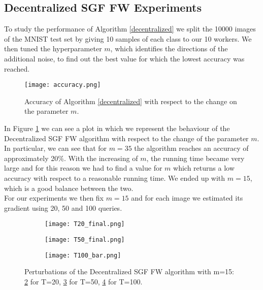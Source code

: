 \subsection{Decentralized SGF FW Experiments}
To study the performance of Algorithm \ref{decentralized} we split the 10000 images of the MNIST test set by giving 10 samples of each class to our 10 workers.
We then tuned the hyperparameter $m$, which identifies the directions of the additional noise, to find out the best value for which the lowest accuracy was reached.
\begin{figure}[htbp]
	\centering
	\texttt{[image: accuracy.png]}
	\caption{{\small Accuracy of Algorithm \ref{decentralized} with respect to the change on the parameter $m$.}}
	\label{fig:accuracy}
\end{figure}
In Figure \ref{fig:accuracy} we can see a plot in which we represent the behaviour of the Decentralized SGF FW algorithm  with respect to the change of the parameter $m$. In particular, we can see that for $m=35$ the algorithm reaches an accuracy of approximately 20\%. With the increasing of $m$, the running time became very large and for this reason we had to find a value for $m$ which returns a low accuracy with respect to a reasonable running time. We ended up with $m=15$, which is a good balance between the two.\\
\indent For our experiments we then fix $m=15$ and for each image we estimated its gradient using 20, 50 and 100 queries.

\begin{figure}[h]
	\centering
	\begin{subfigure}[b]{0.15\textwidth}
		\centering
		\texttt{[image: T20\_final.png]}
		\caption{}
		\label{fig:decentralized_perturbation_20}
	\end{subfigure}
	\hfill
	\begin{subfigure}[b]{0.15\textwidth}
		\texttt{[image: T50\_final.png]}
		\caption{}
		\label{fig:decentralized_perturbation_50}
	\end{subfigure}
	\hfill
	\begin{subfigure}[b]{0.15\textwidth}
		\texttt{[image: T100\_bar.png]}
		\caption{}
		\label{fig:decentralized_perturbation_100}
	\end{subfigure}
	\caption{{\small Perturbations of the Decentralized SGF FW algorithm with m=15: \ref{fig:decentralized_perturbation_20} for T=20, \ref{fig:decentralized_perturbation_50} for T=50,  \ref{fig:decentralized_perturbation_100} for T=100.}}
	\label{fig:decentralized_perturbations}
\end{figure}


